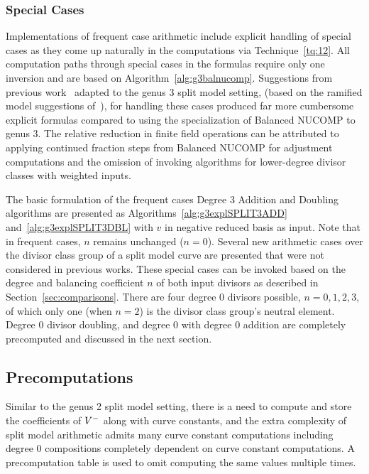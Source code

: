 \subsubsection{Special Cases}
Implementations of frequent case arithmetic include explicit handling of special
cases as they come up naturally in the computations via Technique~\ref{tq:12}.
All computation paths through special cases in the formulas require only one
inversion and are based on Algorithm~\ref{alg:g3balnucomp}. Suggestions from
previous work~\cite{EricksonJacobsonStein_realg2_2011} adapted to the genus 3
split model setting, (based on the ramified model suggestions
of~\cite{Lange_explicit_2005}), for handling these cases produced far more
cumbersome explicit formulas compared to using the specialization of Balanced
NUCOMP to genus 3. The relative reduction in finite field operations can be
attributed to applying continued fraction steps from Balanced NUCOMP for
adjustment computations and the omission of invoking algorithms for lower-degree
divisor classes with weighted inputs.

The basic formulation of the frequent cases Degree 3 Addition and Doubling
algorithms are presented as Algorithms~\ref{alg:g3explSPLIT3ADD}
and~\ref{alg:g3explSPLIT3DBL} with  $v$ in negative reduced basis as input. Note
that in frequent cases, $n$ remains unchanged ($n = 0$). Several new arithmetic
cases over the divisor class group of a split model curve are presented that
were not considered in previous works. These special cases can be invoked based
on the degree and balancing coefficient $n$ of both input divisors as described
in Section~\ref{sec:comparisons}. There are four degree 0 divisors possible,
$n=0,1,2,3$, of which only one (when $n=2$) is the divisor class group's neutral
element. Degree 0 divisor doubling, and degree 0 with degree 0 addition are
completely precomputed and discussed in the next section.

\subsection{Precomputations}\label{sec:g3precompute}
Similar to the genus 2 split model setting, there is a need to compute and store
the coefficients of $V^{-}$ along with curve constants, and the extra complexity
of split model arithmetic admits many curve constant computations including
degree 0 compositions completely dependent on curve constant computations. A
precomputation table is used to omit computing the same values multiple times.

